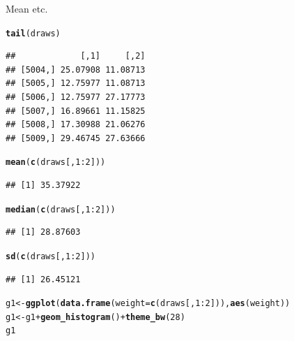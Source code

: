 \documentclass{article}\usepackage[]{graphicx}\usepackage[]{color}
\makeatletter
\newcommand{\hlnum}[1]{\textcolor[rgb]{0.686,0.059,0.569}{#1}}%
\newcommand{\hlopt}[1]{\textcolor[rgb]{0,0,0}{#1}}%
\newcommand{\hlstd}[1]{\textcolor[rgb]{0.345,0.345,0.345}{#1}}%
\newcommand{\hlkwb}[1]{\textcolor[rgb]{0.69,0.353,0.396}{#1}}%
\newcommand{\hlkwc}[1]{\textcolor[rgb]{0.333,0.667,0.333}{#1}}%
\newcommand{\hlkwd}[1]{\textcolor[rgb]{0.737,0.353,0.396}{\textbf{#1}}}%
\newenvironment{kframe}{%
 \def\at@end@of@kframe{}%
 \ifinner\ifhmode%
  \def\at@end@of@kframe{\end{minipage}}%
  \begin{minipage}{\columnwidth}%
 \fi\fi%
 \def\FrameCommand##1{\hskip\@totalleftmargin \hskip-\fboxsep
 \colorbox{shadecolor}{##1}\hskip-\fboxsep
     \hskip-\linewidth \hskip-\@totalleftmargin \hskip\columnwidth}%
 \MakeFramed {\advance\hsize-\width
   \@totalleftmargin\z@ \linewidth\hsize
   \@setminipage}}%
 {\par\unskip\endMakeFramed%
 \at@end@of@kframe}
\newenvironment{knitrout}{}{} %
\makeatother
\begin{document}
Mean etc.

\begin{knitrout}
\color{fgcolor}\begin{kframe}
\begin{alltt}
\hlkwd{tail}\hlstd{(draws)}
\end{alltt}
\begin{verbatim}
##             [,1]     [,2]
## [5004,] 25.07908 11.08713
## [5005,] 12.75977 11.08713
## [5006,] 12.75977 27.17773
## [5007,] 16.89661 11.15825
## [5008,] 17.30988 21.06276
## [5009,] 29.46745 27.63666
\end{verbatim}
\begin{alltt}
\hlkwd{mean}\hlstd{(}\hlkwd{c}\hlstd{(draws[,} \hlnum{1}\hlopt{:}\hlnum{2}\hlstd{]))}
\end{alltt}
\begin{verbatim}
## [1] 35.37922
\end{verbatim}
\begin{alltt}
\hlkwd{median}\hlstd{(}\hlkwd{c}\hlstd{(draws[,} \hlnum{1}\hlopt{:}\hlnum{2}\hlstd{]))}
\end{alltt}
\begin{verbatim}
## [1] 28.87603
\end{verbatim}
\begin{alltt}
\hlkwd{sd}\hlstd{(}\hlkwd{c}\hlstd{(draws[,} \hlnum{1}\hlopt{:}\hlnum{2}\hlstd{]))}
\end{alltt}
\begin{verbatim}
## [1] 26.45121
\end{verbatim}
\begin{alltt}
\hlstd{g1} \hlkwb{<-} \hlkwd{ggplot}\hlstd{(}\hlkwd{data.frame}\hlstd{(}\hlkwc{weight} \hlstd{=} \hlkwd{c}\hlstd{(draws[,} \hlnum{1}\hlopt{:}\hlnum{2}\hlstd{])),} \hlkwd{aes}\hlstd{(weight))}
\hlstd{g1} \hlkwb{<-} \hlstd{g1} \hlopt{+} \hlkwd{geom_histogram}\hlstd{()} \hlopt{+} \hlkwd{theme_bw}\hlstd{(}\hlnum{28}\hlstd{)}
\hlstd{g1}
\end{alltt}



\end{kframe}
\end{knitrout}
\end{document}
